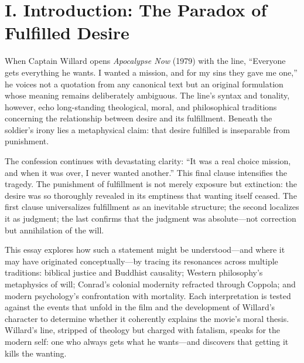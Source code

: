 \section*{I. Introduction: The Paradox of Fulfilled Desire}
\label{sec:i-introduction-the-paradox-of-fulfilled-desire}
When Captain Willard opens \textit{Apocalypse Now} (1979) with the line, ``Everyone gets
everything he wants. I wanted a mission, and for my sins they gave me one,'' he voices not a
quotation from any canonical text but an original formulation whose meaning remains deliberately
ambiguous. The line's syntax and
tonality, however, echo long-standing theological, moral, and philosophical traditions
concerning the relationship between desire and its fulfillment. Beneath the soldier's irony
lies a metaphysical claim: that desire fulfilled is inseparable from punishment.

The confession continues with devastating clarity: ``It was a real choice mission, and when it
was over, I never wanted another.'' This final clause intensifies the tragedy. The punishment
of fulfillment is not merely exposure but extinction: the desire was so thoroughly revealed in
its emptiness that wanting itself ceased. The first clause universalizes fulfillment as an
inevitable structure; the second localizes it as judgment; the last confirms that the judgment
was absolute---not correction but annihilation of the will.

This essay explores how such a statement might be understood—and where it may have originated
conceptually—by tracing its resonances across multiple traditions: biblical justice and
Buddhist causality; Western philosophy's metaphysics of will; Conrad's colonial modernity
refracted through Coppola; and modern psychology's confrontation with mortality. Each
interpretation is tested against the events that unfold in the film and the development of
Willard's character to determine whether it coherently explains the movie's moral thesis.
Willard's line, stripped of theology but charged with fatalism, speaks for the modern self:
one who always gets what he wants—and discovers that getting it kills the wanting.
